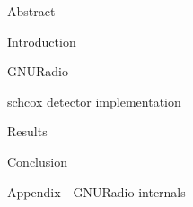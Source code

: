 




\usepackage{antropy_en}


  

  \begin{topchapter}{Abstract}
    
  \end{topchapter}

  \begin{topchapter}{Introduction}
    
  \end{topchapter}

  \begin{topchapter}{GNURadio}
    
  \end{topchapter}

  \begin{topchapter}{\acrlong{schcox} detector implementation}
    
  \end{topchapter}

  \begin{topchapter}{Results}
    
  \end{topchapter}

  \begin{topchapter}{Conclusion}
    
  \end{topchapter}

  \begin{topchapter}{Appendix - GNURadio internals}
    
  \end{topchapter}

  \newpage
  \printglossaries
  \printbibliography

